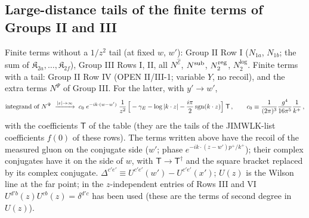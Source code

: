 \documentclass[9pt]{article}
\numberwithin{equation}{section}
\begin{document}
\subsection{Large-distance tails of the finite terms of Groups II and III}\label{sec:tails}
\noindent Finite terms without a $1/z^{2}$ tail (at fixed $w$, $w'$): Group II Row I ($N_{1a}$, $N_{1b}$; the sum of $\mathfrak{K}_{2a},\dots,\mathfrak{K}_{2f}$), Group III Rows I, II, all $N^{\widehat{\mathcal{E}}}$, $N^{\rm sub}$, $N_{2}^{\rm reg}$, $N_{2}^{\log}$. Finite terms with a tail: Group II Row IV (OPEN II/III-1; variable $Y$, no recoil), and the extra terms $N^{\Psi}$ of Group III. For the latter, with $y'\to w'$,
\begin{align}
\text{integrand of }N^{\Psi}\;\xrightarrow{|z|\to\infty}\;c_{0}\;e^{-ik\cdot(w-w')}\;\frac{1}{z^{2}}\,\Big[-\gamma_{E}-\log|k\cdot z|-\frac{i\pi}{2}\,{\rm sgn}(k\cdot z)\Big]\;\mathsf{T}\,,\qquad c_{0}\equiv\frac{1}{(2\pi)^{3}}\frac{g^{4}}{16\pi^{5}}\frac{1}{k^{+}}\,,\notag
\end{align}
with the coefficients $\mathsf{T}$ of the table (they are the tails of the JIMWLK-list coefficients $f(0)$ of these rows). The terms written above have the recoil of the measured gluon on the conjugate side ($w'$; phase $e^{-ik\cdot(z-w')p^{+}/k^{+}}$); their complex conjugates have it on the side of $w$, with $\mathsf{T}\to\mathsf{T}^{\dagger}$ and the square bracket replaced by its complex conjugate. $\Delta^{c'e'}\equiv U^{c'e'}(w')-U^{c'e'}(x')$; $U(z)$ is the Wilson line at the far point; in the $z$-independent entries of Rows III and VI $U^{d'b}(z)U^{cb}(z)=\delta^{d'c}$ has been used (these are the terms of second degree in $U(z)$).
\end{document}
